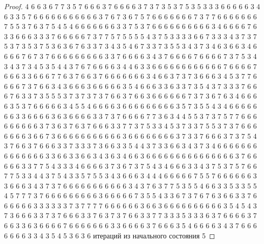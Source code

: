 \begin{proof}
	4 6 6 3 6 7 7 3 5 7 6 6 6 3 7 6 6 6 6 3 7 3 7 3 5 3 7 5 3 5 3 3 3 6 6 6 6 6 3 4 6 3 3 5 7 6 6 6 6 6 6 6 6 6 6 6 3 7 6 7 3 6 7 5 7 6 6 6 6 6 6 6 7 3 7 7 6 6 6 6 6 6 6 7 5 5 3 7 6 3 7 5 4 5 4 6 6 6 6 6 6 6 3 3 7 5 3 7 6 6 6 6 6 6 6 6 6 6 3 4 6 6 6 6 7 6 3 3 6 6 6 3 3 3 7 6 6 6 6 6 7 3 7 7 5 7 5 5 5 5 4 3 7 5 3 3 3 3 6 6 7 3 3 3 4 3 7 3 7 5 3 7 3 5 3 7 5 3 6 3 6 7 6 3 3 7 3 4 3 5 4 6 7 3 3 7 3 5 5 3 4 3 7 3 4 6 3 6 6 3 4 6 6 6 6 7 6 7 3 7 6 6 6 6 6 6 6 6 6 3 3 7 6 6 6 6 3 4 3 7 6 6 6 6 7 6 6 6 6 7 3 7 5 3 4 3 4 3 7 3 4 5 3 5 4 4 3 7 6 7 6 6 6 6 3 4 4 6 3 3 6 6 6 6 6 6 6 6 6 6 6 6 7 6 6 6 6 7 6 6 6 3 3 6 6 6 7 7 6 3 7 6 6 3 7 6 6 6 6 6 6 6 3 4 6 6 3 7 3 7 3 6 6 6 3 4 5 3 7 7 6 6 6 6 7 3 7 6 6 3 4 3 6 6 6 3 6 6 6 6 6 3 5 4 6 6 6 3 3 6 3 3 7 3 5 4 3 7 3 3 3 7 6 6 6 7 6 3 3 7 3 5 5 5 3 7 3 7 3 7 3 7 6 6 3 7 6 6 3 6 6 6 6 6 6 7 3 7 3 6 7 6 3 4 6 6 6 6 3 5 3 7 6 6 6 6 6 3 4 5 5 4 6 6 6 6 3 6 6 6 6 6 6 6 6 6 3 5 7 3 5 5 4 3 4 6 6 6 6 6 6 6 3 3 6 6 6 6 3 6 3 6 6 6 6 3 3 7 3 7 6 6 6 6 7 7 3 6 3 4 4 5 5 3 7 3 7 5 7 7 6 6 6 6 6 6 6 6 6 3 7 3 6 3 7 6 3 7 6 6 6 3 3 7 7 3 7 5 3 3 4 5 3 7 3 3 7 5 5 3 7 3 7 6 6 6 6 6 6 6 3 6 6 7 3 6 6 6 6 6 6 6 6 6 6 6 3 6 6 6 6 6 6 6 6 3 7 3 3 7 6 6 6 3 7 3 7 5 4 3 7 6 6 3 7 6 6 6 3 3 7 3 3 3 7 3 6 6 3 3 5 4 4 3 7 3 3 6 6 3 4 3 7 3 4 6 6 6 6 6 6 6 6 6 6 6 6 6 6 3 3 6 6 3 3 6 6 3 4 3 6 3 4 6 6 3 6 6 6 6 6 6 6 6 6 6 6 6 6 6 6 3 7 6 6 6 6 6 3 3 7 7 5 4 3 3 3 4 6 6 6 6 3 7 3 6 7 3 7 5 4 3 4 6 6 6 3 3 4 3 7 5 3 7 5 7 6 6 7 7 5 3 3 4 4 3 7 5 4 3 3 5 7 5 5 3 4 3 6 6 6 3 4 4 4 6 6 6 6 6 7 5 5 7 6 6 6 6 6 6 3 3 6 6 6 3 4 3 7 3 7 6 6 6 6 6 6 6 6 6 6 6 3 4 3 7 6 3 7 7 5 3 5 5 4 6 6 3 3 5 3 3 5 5 4 5 7 7 7 3 7 6 6 6 6 6 6 6 6 6 3 6 6 6 6 6 7 3 5 5 4 3 3 6 7 3 7 6 7 6 3 6 6 3 3 7 6 6 6 6 6 6 3 3 3 3 3 3 7 3 7 7 7 7 6 6 6 6 6 6 3 6 6 3 6 6 6 6 6 6 6 6 6 6 3 5 4 5 4 3 7 3 6 6 6 3 3 7 3 7 6 6 6 3 3 7 6 3 7 3 7 6 6 3 3 7 7 3 3 3 5 3 3 3 6 3 7 6 6 6 6 3 7 6 6 3 3 6 3 6 6 6 6 7 6 6 6 6 6 6 6 3 3 6 6 6 6 3 7 6 6 6 3 5 4 6 6 6 6 3 4 3 7 6 6 6 6 6 6 6 3 3 4 3 5 4 5 3 6 3 6 
	\newline
	 итераций из начального состояния 5
	\newline

\end{proof}
